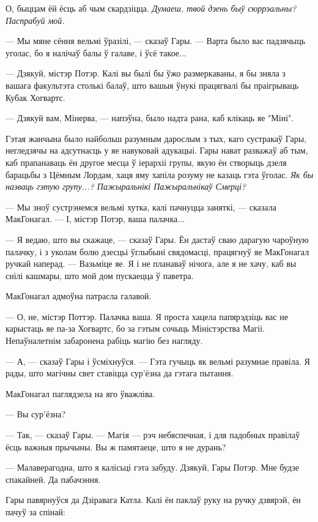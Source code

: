 О, быццам ёй ёсць аб чым скардзіцца. \emph{Думаеш, твой дзень быў сюррэальны? 
Паспрабуй мой.}

--- Мы мяне сёння вельмі ўразілі, --- сказаў Гары. --- Варта было вас падзячыць 
уголас, бо я налічаў балы ў галаве, і ўсё такое...

--- Дзякуй, містэр Потэр. Калі вы былі бы ўжо размеркаваны, я бы зняла з 
вашага факультэта столькі балаў, што вашыя ўнукі працягвалі бы праігрываць
Кубак Хогвартс. 

--- Дзякуй вам, Мінерва, --- напэўна, было надта рана, каб клікаць яе
"Міні".

Гэтая жанчына было найбольш разумным дарослым з тых, каго сустракаў Гары,
негледзячы на адсутнасць у яе навуковай адукацыі. Гары нават разважаў аб тым,
каб прапанаваць ён другое месца ў іерархіі групы, якую ён створыць дзеля
барацьбы з Цёмным Лордам, хаця яму хапіла розуму не казаць гэта ўголас.
\emph{Як бы назваць гэтую групу...? Пажыральнікі Пажыральнікаў Смерці?}

--- Мы зноў сустрэнемся вельмі хутка, калі пачнуцца заняткі, --- сказала
МакГонагал. --- І, містэр Потэр, ваша палачка...

--- Я ведаю, што вы скажаце, --- сказаў Гары. Ён дастаў сваю дарагую чароўную
палачку, і з уколам болю дзесцьі ўглыбыні свядомасці, працягнуў яе МакГонагал
ручкай наперад. --- Вазьміце яе. Я і не планаваў нічога, але я не хачу, каб
вы снілі кашмары, што мой дом пускаецца ў паветра.

МакГонагал адмоўна патрасла галавой. 

--- О, не, містэр Поттэр. Палачка ваша. Я проста хацела папярэдзіць вас не 
карыстаць яе па-за Хогвартс, бо за гэтым сочыць Міністэрства Магіі. Непаўналетнім
забаронена рабіць магію без нагляду.

--- А, --- сказаў Гары і ўсміхнуўся. --- Гэта гучыць як вельмі разумнае правіла.
Я рады, што магічны свет ставіцца сур'ёзна да гэтага пытання.

МакГонагал паглядзела на яго ўважліва. 

--- Вы сур'ёзна?

--- Так, --- сказаў Гары. --- Магія --- рэч небяспечная, і для падобных правілаў
ёсць важныя прычыны. Вы ж памятаеце, што я не дурань?

--- Малаверагодна, што я калісьці гэта забуду. Дзякуй, Гары Потэр. Мне будзе
спакайней. Да пабачэння.

Гары павярнуўся да Дзіравага Катла. Калі ён паклаў руку на ручку дзвярэй,
ён пачуў за спінай:

